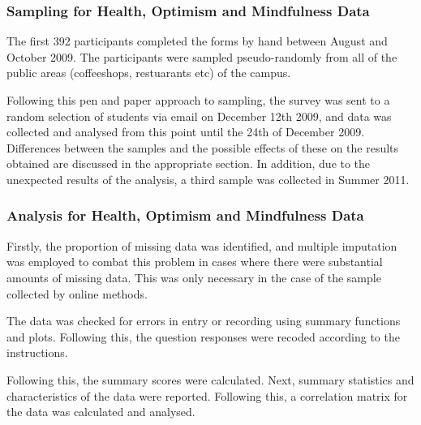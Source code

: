 \subsubsection{Sampling for Health, Optimism and Mindfulness Data}

The first 392 participants completed the forms by hand between August and October 2009. The participants were sampled pseudo-randomly from all of the public areas (coffeeshops, restuarants etc) of the campus.

Following this pen and paper approach to sampling, the survey was sent to a random selection of students via email on December 12th 2009, and data was collected and analysed from this point until the 24th of December 2009. Differences between the samples and the possible effects of these on the results obtained are discussed in the appropriate section. In addition, due to the unexpected results of the analysis, a third sample was collected in Summer 2011. 

\subsubsection{Analysis for Health, Optimism and Mindfulness Data}

Firstly, the proportion of missing data was identified, and multiple imputation was employed to combat this problem in cases where there were substantial amounts of missing data. This was only necessary in the case of the sample collected by online methods. 


The data was checked for errors in entry or recording using summary functions and plots. Following this, the question responses were recoded according to the instructions.

Following this, the summary scores were calculated. Next, summary statistics and characteristics of the data were reported. %
Following this, a correlation matrix for the data was calculated and analysed.


